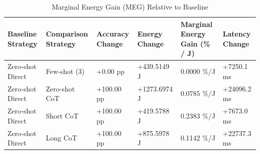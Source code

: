 \begin{table}
\caption{Marginal Energy Gain (MEG) Relative to Baseline}
\label{tab:marginal_energy_gain}
\begin{tabular}{llllll}
\toprule
Baseline Strategy & Comparison Strategy & Accuracy Change & Energy Change & Marginal Energy Gain (\% / J) & Latency Change \\
\midrule
Zero-shot Direct & Few-shot (3) & +0.00 pp & +439.5149 J & 0.0000 \%/J & +7250.1 ms \\
Zero-shot Direct & Zero-shot CoT & +100.00 pp & +1273.6974 J & 0.0785 \%/J & +24096.2 ms \\
Zero-shot Direct & Short CoT & +100.00 pp & +419.5788 J & 0.2383 \%/J & +7673.0 ms \\
Zero-shot Direct & Long CoT & +100.00 pp & +875.5978 J & 0.1142 \%/J & +22737.3 ms \\
\bottomrule
\end{tabular}
\end{table}
